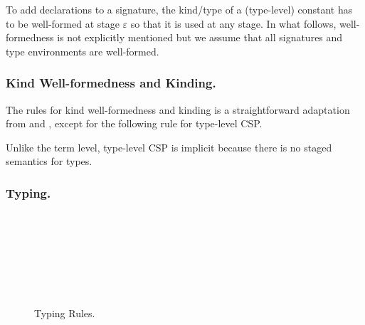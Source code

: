 To add declarations to a signature, the kind/type of a (type-level)
constant has to be well-formed at stage \(\varepsilon\) so that it is
used at any stage.  In what follows, well-formedness is not explicitly
mentioned but we assume that all signatures and type environments are
well-formed.

\subsubsection{Kind Well-formedness and Kinding.}

The rules for kind well-formedness and kinding is a straightforward
adaptation from \LLF and \LTP, except for the following rule for type-level CSP.
\begin{center}
\end{center}
Unlike the term level, type-level CSP is implicit because there is no staged
semantics for types.

\subsubsection{Typing.}

\begin{figure}[tbp]
  \begin{center}
     \hfil
     \\[2mm]
     \\[2mm]
     \\[2mm]
     \\[2mm]
     \andalso
     \\[2mm]
     \\[2mm]
     \andalso
    \caption{Typing Rules.}
    \label{fig:typing-rules}
  \end{center}
\end{figure}

